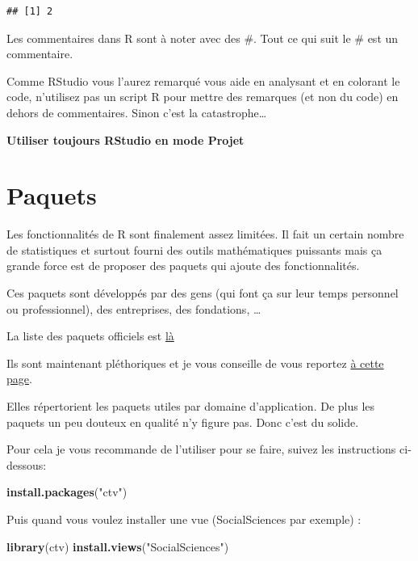 \documentclass[
]{book}
\newenvironment{Shaded}{\begin{snugshade}}{\end{snugshade}}
\newcommand{\FunctionTok}[1]{\textcolor[rgb]{0.13,0.29,0.53}{\textbf{#1}}}
\newcommand{\NormalTok}[1]{#1}
\newcommand{\StringTok}[1]{\textcolor[rgb]{0.31,0.60,0.02}{#1}}
\begin{document}
\begin{verbatim}
## [1] 2
\end{verbatim}

Les commentaires dans R sont à noter avec des \#. Tout ce qui suit le \# est un
commentaire.

Comme RStudio vous l'aurez remarqué vous aide en analysant et en colorant le
code, n'utilisez pas un script R pour mettre des remarques (et non du code) en
dehors de commentaires. Sinon c'est la catastrophe\ldots{}

\textbf{Utiliser toujours RStudio en mode Projet}

\hypertarget{paquets}{%
\section{Paquets}\label{paquets}}

Les fonctionnalités de R sont finalement assez limitées. Il fait un certain
nombre de statistiques et surtout fourni des outils mathématiques puissants
mais ça grande force est de proposer des paquets qui ajoute des fonctionnalités.

Ces paquets sont développés par des gens (qui font ça sur leur temps personnel
ou professionnel), des entreprises, des fondations, \ldots{}

La liste des paquets officiels est \href{https://cran.r-project.org/web/packages/available_packages_by_name.html}{là}

Ils sont maintenant pléthoriques et je vous conseille de vous reportez \href{https://cran.r-project.org/web/views/}{à cette page}.

Elles répertorient les paquets utiles par domaine d'application. De plus les
paquets un peu douteux en qualité n'y figure pas. Donc c'est du solide.

Pour cela je vous recommande de l'utiliser pour se faire, suivez les instructions ci-dessous:

\begin{Shaded}
\begin{Highlighting}[]
\FunctionTok{install.packages}\NormalTok{(}\StringTok{"ctv"}\NormalTok{)}
\end{Highlighting}
\end{Shaded}

Puis quand vous voulez installer une vue (SocialSciences par exemple) :

\begin{Shaded}
\begin{Highlighting}[]
\FunctionTok{library}\NormalTok{(ctv)}
\FunctionTok{install.views}\NormalTok{(}\StringTok{"SocialSciences"}\NormalTok{)}
\end{Highlighting}
\end{Shaded}
\end{document}
